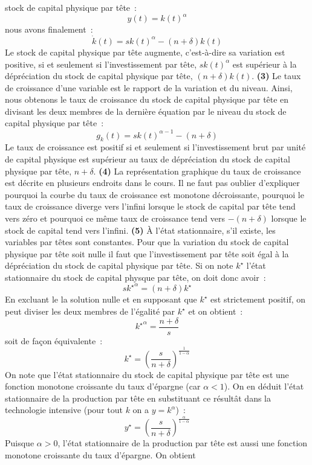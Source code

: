 \documentclass[10pt,a4paper,notitlepage,twocolumn]{article}
\newcommand{\question}[1]{\textbf{(#1)}}
\begin{document}
stock de capital physique par tête :
\[
y(t) = k(t)^{\alpha}
\]
nous avons finalement :
\[
\dot k(t) = s k(t)^{\alpha} - (n+\delta)k(t)
\]
Le stock de capital physique par tête augmente, c'est-à-dire sa
variation est positive, si et seulement si l'investissement par tête,
$sk(t)^{\alpha}$ est supérieur à la dépréciation du stock de capital
physique par tête, $(n+\delta)k(t)$. \question{3} Le taux de
croissance d'une variable est le rapport de la variation et du
niveau. Ainsi, nous obtenons le taux de croissance du stock de capital
physique par tête en divisant les deux membres de la dernière équation
par le niveau du stock de capital physique par tête :
\[
g_{k}(t) = s k(t)^{\alpha-1} - (n+\delta)
\]
Le taux de croissance est positif si et seulement si l'investissement
brut par unité de capital physique est supérieur au taux de
dépréciation du stock de capital physique par tête,
$n+\delta$. \question{4} La représentation graphique du taux de
croissance est décrite en plusieurs endroits dans le cours. Il ne faut
pas oublier d'expliquer pourquoi la courbe du taux de croissance est
monotone décroissante, pourquoi le taux de croissance diverge vers
l'infini lorsque le stock de capital par tête tend vers zéro et
pourquoi ce même taux de croissance tend vers $-(n+\delta)$ lorsque le
stock de capital tend vers l'infini. \question{5} À l'état
stationnaire, s'il existe, les variables par têtes sont
constantes. Pour que la variation du stock de capital physique par
tête soit nulle il faut que l'investissement par tête soit égal à la
dépréciation du stock de capital physique par tête. Si on note
$k^\star$ l'état stationnaire du stock de capital physque par tête, on
doit donc avoir :
\[
  s\left. k^{\star} \right.^{\alpha} = (n+\delta) k^{\star}
\]
En excluant le la solution nulle et en supposant que $k^{\star}$ est
strictement positif, on peut diviser les deux membres de l'égalité par
$k^{\star}$ et on obtient :
\[
 \left. k^{\star} \right.^{\alpha} = \frac{n+\delta}{s}
\]
soit de façon équivalente :
\[
k^{\star} = \left(\frac{s}{n+\delta}\right)^{\frac{1}{1-\alpha}}
\]
On note que l'état stationnaire du stock de capital physique par tête
est une fonction monotone croissante du taux d'épargne (car
$\alpha<1$). On en déduit l'état stationnaire de la production par
tête en substituant ce résultât dans la technologie intensive (pour
tout $k$ on a $y=k^{\alpha}$) :
\[
y^{\star} = \left(\frac{s}{n+\delta}\right)^{\frac{\alpha}{1-\alpha}}
\]
Puisque $\alpha>0$, l'état stationnaire de la production par tête est
aussi une fonction monotone croissante du taux d'épargne. On obtient
\end{document}
